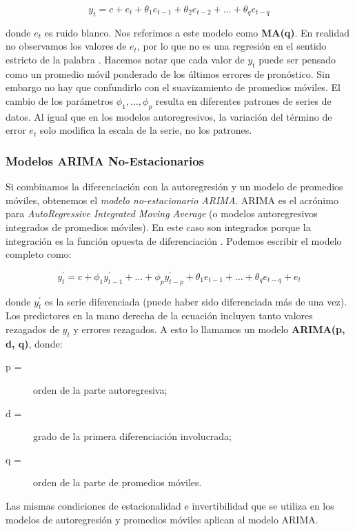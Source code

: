 \[ y_{t} = c + e_{t} + \theta_{1}e_{t-1} + \theta_{2}e_{t-2} + \ldots + \theta_{q}e_{t-q} \]

donde $e_{t}$ es ruido blanco. Nos referimos a este modelo como \textbf{MA(q)}. En realidad no observamos los valores de $e_{t}$, por lo que no es una regresión en el sentido estricto de la palabra \cite{hyndman}. Hacemos notar que cada valor de $y_{t}$ puede ser pensado como un promedio móvil ponderado de los últimos errores de pronóstico. Sin embargo no hay que confundirlo con el suavizamiento de promedios móviles. El cambio de los parámetros $\phi_1, \ldots, \phi_{p}$ resulta en diferentes patrones de series de datos. Al igual que en los modelos autoregresivos, la variación del término de error $e_t$ solo modifica la escala de la serie, no los patrones.

\subsubsection{Modelos ARIMA No-Estacionarios}
Si combinamos la diferenciación con la autoregresión y un modelo de promedios móviles, obtenemos el \emph{modelo no-estacionario ARIMA}. ARIMA es el acrónimo para \emph{AutoRegressive Integrated Moving Average} (o modelos autoregresivos integrados de promedios móviles). En este caso son integrados porque la integración es la función opuesta de diferenciación \cite{hyndman}. Podemos escribir el modelo completo como:

\[ y_{t}^{\prime} = c + \phi_{1}y_{t-1}^{\prime} + \ldots + \phi_{p}y_{t-p}^{\prime} + \theta_{1}e_{t-1} + \ldots + \theta_{q}e_{t-q} + e_{t} \]

donde $y_{t}^{\prime}$ es la serie diferenciada (puede haber sido diferenciada más de una vez). Los predictores en la mano derecha de la ecuación incluyen tanto valores rezagados de $y_t$ y errores rezagados. A esto lo llamamos un modelo \textbf{ARIMA(p, d, q)}, donde:

\begin{description}
  \item [p = ]
  orden de la parte autoregresiva;
  \item [d = ]
  grado de la primera diferenciación involucrada;
  \item [q = ]
  orden de la parte de promedios móviles.
\end{description}

Las mismas condiciones de estacionalidad e invertibilidad que se utiliza en los modelos de autoregresión y promedios móviles aplican al modelo ARIMA.

